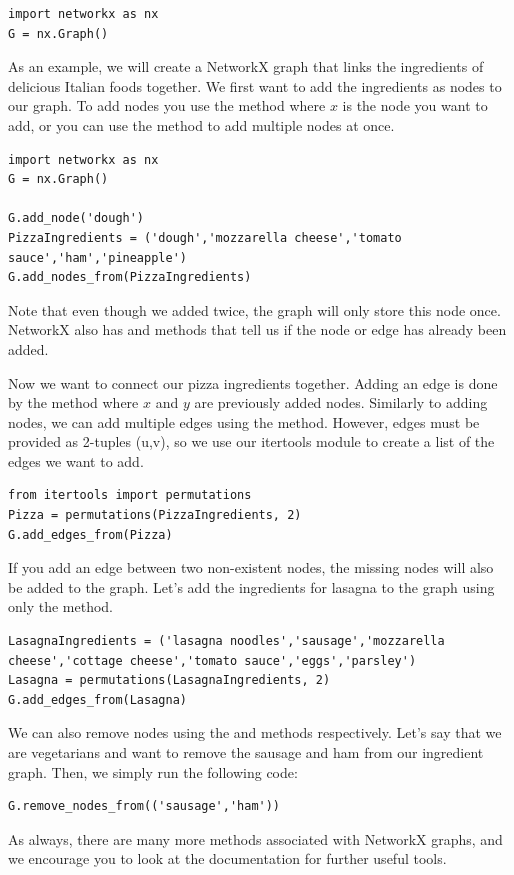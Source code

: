 \begin{lstlisting}
import networkx as nx
G = nx.Graph()
\end{lstlisting}

As an example, we will create a NetworkX graph that links the ingredients of delicious Italian foods together. We first want to add the ingredients as nodes to our graph. 
To add nodes you use the  method where $x$ is the node you want to add, or you can use the  method to add multiple nodes at once.

\begin{lstlisting}
import networkx as nx
G = nx.Graph()

G.add_node('dough')
PizzaIngredients = ('dough','mozzarella cheese','tomato sauce','ham','pineapple')
G.add_nodes_from(PizzaIngredients)
\end{lstlisting}
Note that even though we added  twice, the graph will only store this node once. NetworkX also has  and  methods that tell 
us if the node  or edge  has already been added.

Now we want to connect our pizza ingredients together. Adding an edge is done by the  method where $x$ and $y$ are previously added nodes. Similarly to adding nodes, we can add multiple edges using the  method. However, edges must be provided as 2-tuples (u,v), so we use our itertools module to create a list of the edges we want to add.

\begin{lstlisting}
from itertools import permutations
Pizza = permutations(PizzaIngredients, 2)
G.add_edges_from(Pizza)
\end{lstlisting}
If you add an edge between two non-existent nodes, the missing nodes will also be added to the graph. Let's add the ingredients for lasagna to the graph using only the  method.
\begin{lstlisting}
LasagnaIngredients = ('lasagna noodles','sausage','mozzarella cheese','cottage cheese','tomato sauce','eggs','parsley')
Lasagna = permutations(LasagnaIngredients, 2)
G.add_edges_from(Lasagna)
\end{lstlisting}
We can also remove nodes using the  and  methods respectively. Let's say that we are vegetarians and want to remove the sausage and ham from our ingredient graph. Then, we simply run the following code:
\begin{lstlisting}
G.remove_nodes_from(('sausage','ham'))
\end{lstlisting}
As always, there are many more methods associated with NetworkX graphs, and we encourage you to look at the documentation for further useful tools.

